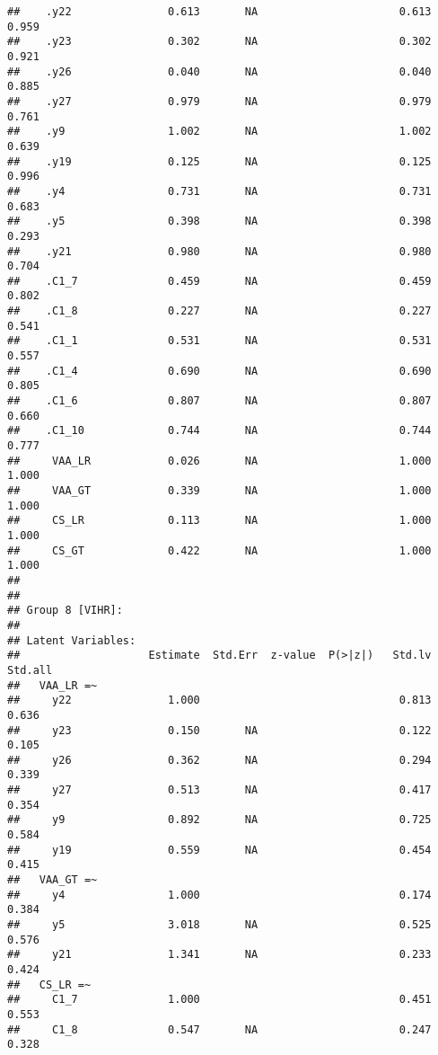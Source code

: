 \documentclass[
]{article}
\begin{document}
\begin{verbatim}
##    .y22               0.613       NA                      0.613    0.959
##    .y23               0.302       NA                      0.302    0.921
##    .y26               0.040       NA                      0.040    0.885
##    .y27               0.979       NA                      0.979    0.761
##    .y9                1.002       NA                      1.002    0.639
##    .y19               0.125       NA                      0.125    0.996
##    .y4                0.731       NA                      0.731    0.683
##    .y5                0.398       NA                      0.398    0.293
##    .y21               0.980       NA                      0.980    0.704
##    .C1_7              0.459       NA                      0.459    0.802
##    .C1_8              0.227       NA                      0.227    0.541
##    .C1_1              0.531       NA                      0.531    0.557
##    .C1_4              0.690       NA                      0.690    0.805
##    .C1_6              0.807       NA                      0.807    0.660
##    .C1_10             0.744       NA                      0.744    0.777
##     VAA_LR            0.026       NA                      1.000    1.000
##     VAA_GT            0.339       NA                      1.000    1.000
##     CS_LR             0.113       NA                      1.000    1.000
##     CS_GT             0.422       NA                      1.000    1.000
## 
## 
## Group 8 [VIHR]:
## 
## Latent Variables:
##                    Estimate  Std.Err  z-value  P(>|z|)   Std.lv  Std.all
##   VAA_LR =~                                                             
##     y22               1.000                               0.813    0.636
##     y23               0.150       NA                      0.122    0.105
##     y26               0.362       NA                      0.294    0.339
##     y27               0.513       NA                      0.417    0.354
##     y9                0.892       NA                      0.725    0.584
##     y19               0.559       NA                      0.454    0.415
##   VAA_GT =~                                                             
##     y4                1.000                               0.174    0.384
##     y5                3.018       NA                      0.525    0.576
##     y21               1.341       NA                      0.233    0.424
##   CS_LR =~                                                              
##     C1_7              1.000                               0.451    0.553
##     C1_8              0.547       NA                      0.247    0.328

\end{verbatim}
\end{document}
